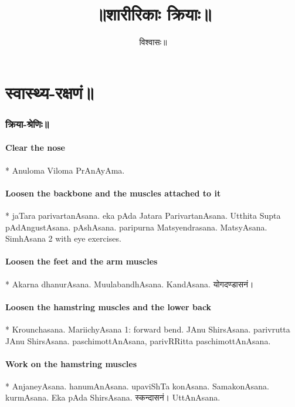 \documentclass[oneside, article]{memoir}
\title{॥शारीरिकाः क्रियाः॥}
\author{विश्वासः॥}
\begin{document}
\maketitle

\tableofcontents

\part{स्वास्थ्य-रक्षणं॥}
\section{क्रिया-श्रेणिः॥}
\subsection{Clear the nose}

    * Anuloma Viloma PrAnAyAma.

\subsection{Loosen the backbone and the muscles attached to it}

    * jaTara parivartanAsana. eka pAda Jatara ParivartanAsana. Utthita Supta pAdAngustAsana. pAshAsana. paripurna Matsyendrasana. MatsyAsana. SimhAsana 2 with eye exercises.

\subsection{Loosen the feet and the arm muscles}

    * Akarna dhanurAsana. MuulabandhAsana. KandAsana. योगदण्डासनं।

\subsection{Loosen the hamstring muscles and the lower back}

    * Krounchasana. MariichyAsana 1: forward bend. JAnu ShirsAsana. parivrutta JAnu ShirsAsana. paschimottAnAsana, parivRRitta paschimottAnAsana.

\subsection{Work on the hamstring muscles}

    * AnjaneyAsana. hanumAnAsana. upaviShTa konAsana. SamakonAsana. kurmAsana. Eka pAda ShirsAsana. स्कन्दासनं। UttAnAsana.
\end{document}
